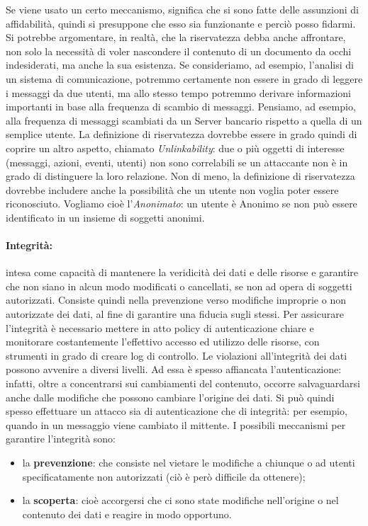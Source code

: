 Se viene usato un certo meccanismo, significa che si sono fatte delle assunzioni
di affidabilità, quindi si presuppone che esso sia funzionante e perciò posso fidarmi.
Si potrebbe argomentare, in realtà, che la riservatezza debba anche affrontare,
non solo la necessità di voler nascondere il contenuto di un documento da occhi
indesiderati, ma anche la sua esistenza. Se consideriamo, ad esempio, l’analisi
di un sistema di comunicazione, potremmo certamente non essere in grado di leggere
i messaggi da due utenti, ma allo stesso tempo potremmo derivare informazioni
importanti in base alla frequenza di scambio di messaggi.
Pensiamo, ad esempio, alla frequenza di messaggi scambiati da un Server bancario
rispetto a quella di un semplice utente.
La definizione di riservatezza dovrebbe essere in grado quindi di coprire un
altro aspetto, chiamato \textit{Unlinkability}: due o più oggetti di interesse
(messaggi, azioni, eventi, utenti) non sono correlabili se un attaccante non è
in grado di distinguere la loro relazione.
Non di meno, la definizione di riservatezza dovrebbe includere anche la
possibilità che un utente non voglia poter essere riconosciuto. Vogliamo cioè
l'\textit{Anonimato}: un utente è Anonimo se non può essere identificato in
un insieme di soggetti anonimi.

\paragraph{Integrità:}
intesa come capacità di mantenere la veridicità dei dati e delle risorse e
garantire che non siano in alcun modo modificati o cancellati, se non ad opera
di soggetti autorizzati. Consiste quindi nella prevenzione verso modifiche
improprie o non autorizzate dei dati, al fine di garantire una fiducia sugli stessi.
Per assicurare l’integrità è necessario mettere in atto policy di autenticazione
chiare e monitorare costantemente l’effettivo accesso ed utilizzo delle risorse,
con strumenti in grado di creare log di controllo. Le violazioni all’integrità
dei dati possono avvenire a diversi livelli.
Ad essa è spesso affiancata l'autenticazione: infatti, oltre a concentrarsi sui
cambiamenti del contenuto, occorre salvaguardarsi anche dalle modifiche che
possono cambiare l’origine dei dati. Si può quindi spesso effettuare un attacco
sia di autenticazione che di integrità: per esempio, quando in un messaggio viene
cambiato il mittente.
I possibili meccanismi per garantire l'integrità sono:

\begin{itemize}
    \item la \textbf{prevenzione}: che consiste nel vietare le modifiche a
          chiunque o ad utenti
          specificatamente non autorizzati (ciò è però difficile da ottenere);
    \item la \textbf{scoperta}: cioè accorgersi che ci sono state modifiche
          nell'origine o nel contenuto dei dati
          e reagire in modo opportuno.
\end{itemize}

